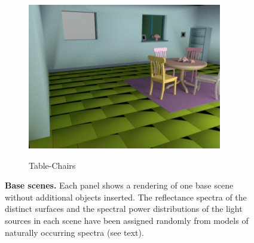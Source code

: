 \documentclass{jov}
\begin{document}
\begin{figure}[t]
\begin{subfigure}[b]{0.22 \textwidth}
        \caption{Table-Chairs}    
        \includegraphics[width=\textwidth]{../FiguresDraft4/Figure3/Figure3_c.png}
        \label{fig:baseSceneTableChairs}
    \end{subfigure}
    \caption{{\bf Base scenes.} Each panel shows a rendering of one base scene without additional objects inserted.  The reflectance spectra of the distinct surfaces and the spectral power distributions of the light sources in each scene have been assigned randomly from models of naturally occurring spectra (see text).}\label{fig:baseScenes}
\end{figure}
\end{document}
